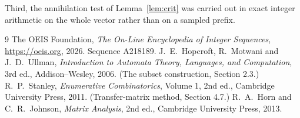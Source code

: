 \documentclass[11pt,a4paper]{article}
\theoremstyle{plain}
\theoremstyle{definition}
\begin{document}
Third, the annihilation test of Lemma~\ref{lem:crit} was carried out in exact integer
arithmetic on the whole vector rather than on a sampled prefix.

\begin{thebibliography}{9}
 The OEIS Foundation, \emph{The On-Line Encyclopedia of Integer
Sequences}, \url{https://oeis.org}, 2026. Sequence A218189.
 J.~E.~Hopcroft, R.~Motwani and J.~D.~Ullman, \emph{Introduction to Automata
Theory, Languages, and Computation}, 3rd ed., Addison--Wesley, 2006. (The subset
construction, Section 2.3.)
 R.~P.~Stanley, \emph{Enumerative Combinatorics}, Volume 1, 2nd ed.,
Cambridge University Press, 2011. (Transfer-matrix method, Section 4.7.)
 R.~A.~Horn and C.~R.~Johnson, \emph{Matrix Analysis}, 2nd ed., Cambridge
University Press, 2013.
\end{thebibliography}
\end{document}
